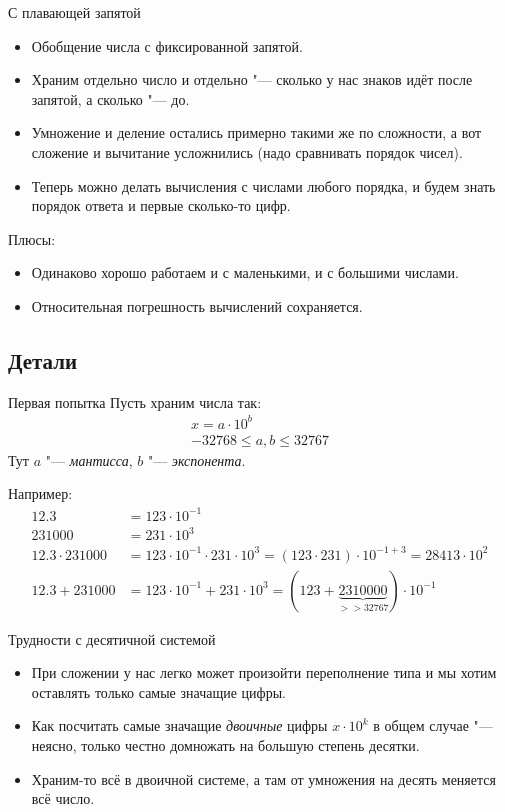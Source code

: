 \begin{frame}{С плавающей запятой}
	\begin{itemize}
		\item
			Обобщение числа с фиксированной запятой.
		\item
			Храним отдельно число и отдельно "--- сколько у нас знаков идёт после запятой, а сколько "--- до.
		\item
			Умножение и деление остались примерно такими же по сложности, а вот сложение и вычитание усложнились (надо сравнивать порядок чисел).
		\item
			Теперь можно делать вычисления с числами любого порядка, и будем знать порядок ответа и первые сколько-то цифр.
	\end{itemize}
	Плюсы:
	\begin{itemize}
		\item
			Одинаково хорошо работаем и с маленькими, и с большими числами.
		\item
			Относительная погрешность вычислений сохраняется.
	\end{itemize}
\end{frame}

\subsection{Детали}
\begin{frame}{Первая попытка}
	Пусть храним числа так:
	\begin{gather*}
		x = a \cdot 10^{b} \\
		-32768 \le a, b \le 32767
	\end{gather*}
	Тут $a$ "--- \textit{мантисса}, $b$ "--- \textit{экспонента}.

	Например:
	\begin{align*}
		12.3 &= 123 \cdot 10^{-1} \\
		231000 &= 231 \cdot 10^3 \\
		12.3 \cdot 231000 &= 123 \cdot 10^{-1} \cdot 231 \cdot 10^3 = (123 \cdot 231) \cdot 10^{-1+3} = 28413 \cdot 10^2 \\
		12.3 + 231000 &= 123 \cdot 10^{-1} + 231 \cdot 10^3 = (123 + \underbrace{2310000}_{>>32767}) \cdot 10^{-1}
	\end{align*}
\end{frame}

\begin{frame}{Трудности с десятичной системой}
	\begin{itemize}
		\item
			При сложении у нас легко может произойти переполнение типа
			и мы хотим оставлять только самые значащие цифры.
		\item
			Как посчитать самые значащие \textit{двоичные} цифры $x \cdot 10^k$ в общем
			случае "--- неясно, только честно домножать на большую степень десятки.
		\item Храним-то всё в двоичной системе, а там от умножения на десять меняется всё число.
	\end{itemize}
\end{frame}


